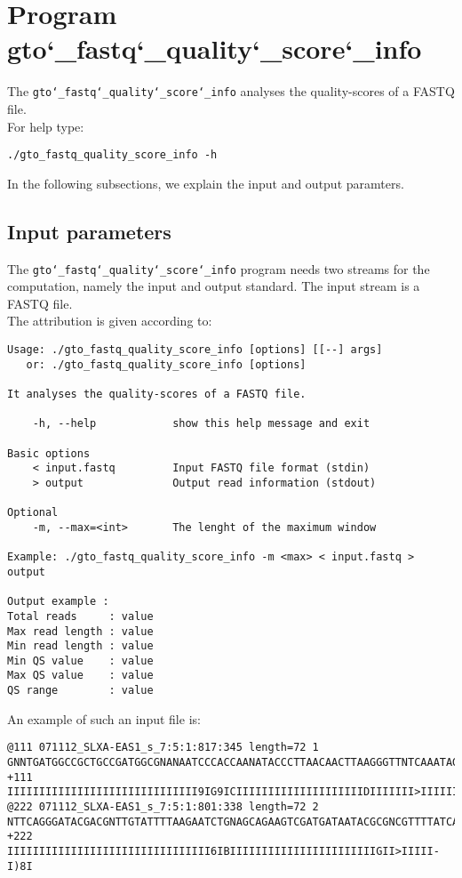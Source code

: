\section{Program gto\char`_fastq\char`_quality\char`_score\char`_info}
The \texttt{gto\char`_fastq\char`_quality\char`_score\char`_info} analyses the quality-scores of a FASTQ file.\\
For help type:
\begin{lstlisting}
./gto_fastq_quality_score_info -h
\end{lstlisting}
In the following subsections, we explain the input and output paramters.

\subsection*{Input parameters}

The \texttt{gto\char`_fastq\char`_quality\char`_score\char`_info} program needs two streams for the computation, namely the input and output standard. The input stream is a FASTQ file.\\
The attribution is given according to:
\begin{lstlisting}
Usage: ./gto_fastq_quality_score_info [options] [[--] args]
   or: ./gto_fastq_quality_score_info [options]

It analyses the quality-scores of a FASTQ file.

    -h, --help            show this help message and exit

Basic options
    < input.fastq         Input FASTQ file format (stdin)
    > output              Output read information (stdout)
    
Optional
    -m, --max=<int>       The lenght of the maximum window

Example: ./gto_fastq_quality_score_info -m <max> < input.fastq > output

Output example :
Total reads     : value
Max read length : value
Min read length : value
Min QS value    : value
Max QS value    : value
QS range        : value
\end{lstlisting}
An example of such an input file is:
\begin{lstlisting}
@111 071112_SLXA-EAS1_s_7:5:1:817:345 length=72 1
GNNTGATGGCCGCTGCCGATGGCGNANAATCCCACCAANATACCCTTAACAACTTAAGGGTTNTCAAATAGA
+111
IIIIIIIIIIIIIIIIIIIIIIIIIIIIII9IG9ICIIIIIIIIIIIIIIIIIIIIDIIIIIII>IIIIII/
@222 071112_SLXA-EAS1_s_7:5:1:801:338 length=72 2
NTTCAGGGATACGACGNTTGTATTTTAAGAATCTGNAGCAGAAGTCGATGATAATACGCGNCGTTTTATCAN
+222
IIIIIIIIIIIIIIIIIIIIIIIIIIIIIIII6IBIIIIIIIIIIIIIIIIIIIIIIIGII>IIIII-I)8I
\end{lstlisting}

